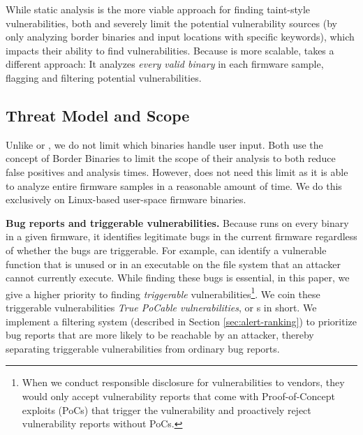 \smallskip

While static analysis is the more viable approach for finding taint-style vulnerabilities, both \karonte and \satc severely limit the potential vulnerability sources (by only analyzing border binaries and input locations with specific keywords), which impacts their ability to find vulnerabilities.
Because \rda is more scalable, \mango takes a different approach:
It analyzes \emph{every valid binary} in each firmware sample, flagging and filtering potential vulnerabilities.

\subsection{Threat Model and Scope}
\label{sec:threat_model}

Unlike \karonte or \satc, we do not limit which binaries handle user input.
Both use the concept of Border Binaries to limit the scope of their analysis to both reduce false positives and analysis times.
However, \mango does not need this limit as it is able to analyze entire firmware samples in a reasonable amount of time.
We do this exclusively on Linux-based user-space firmware binaries.

\smallskip
\noindent
\textbf{Bug reports and triggerable vulnerabilities.}
Because \mango runs on every binary in a given firmware, it identifies legitimate bugs in the current firmware regardless of whether the bugs are triggerable.
For example, \mango can identify a vulnerable function that is unused or in an executable on the file system that an attacker cannot currently execute.
While finding these bugs is essential, in this paper, we give a higher priority to finding \emph{triggerable} vulnerabilities\footnote{When we conduct responsible disclosure for vulnerabilities to vendors, they would only accept vulnerability reports that come with Proof-of-Concept exploits (PoCs) that trigger the vulnerability and proactively reject vulnerability reports without PoCs.}.
We coin these triggerable vulnerabilities \emph{True PoCable vulnerabilities}, or \emph{\trupoc}s in short.
We implement a filtering system (described in Section \ref{sec:alert-ranking}) to prioritize bug reports that are more likely to be reachable by an attacker, thereby separating triggerable vulnerabilities from ordinary bug reports.



